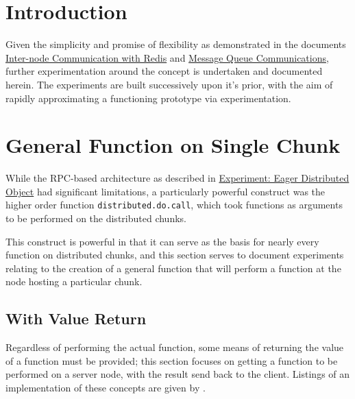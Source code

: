 \hypertarget{introduction}{%
\section{Introduction}\label{introduction}}

Given the simplicity and promise of flexibility as demonstrated in the
documents \href{inter-node-comm-w-redis.html}{Inter-node Communication
with Redis} and \href{message-queues-comms.html}{Message Queue
Communications}, further experimentation around the concept is
undertaken and documented herein. The experiments are built successively
upon it's prior, with the aim of rapidly approximating a functioning
prototype via experimentation.

\hypertarget{general-function-on-single-chunk}{%
\section{General Function on Single
Chunk}\label{general-function-on-single-chunk}}

While the RPC-based architecture as described in
\href{experiment-eager-dist-obj-pre.html}{Experiment: Eager Distributed
Object} had significant limitations, a particularly powerful construct
was the higher order function \texttt{distributed.do.call}, which took
functions as arguments to be performed on the distributed chunks.

This construct is powerful in that it can serve as the basis for nearly
every function on distributed chunks, and this section serves to
document experiments relating to the creation of a general function that
will perform a function at the node hosting a particular chunk.

\hypertarget{sec:val-ret}{%
\subsection{With Value Return}\label{sec:val-ret}}

Regardless of performing the actual function, some means of returning
the value of a function must be provided; this section focuses on
getting a function to be performed on a server node, with the result
send back to the client. Listings of an implementation of these concepts
are given by \cite{lst:vr-client}\cite{lst:vr-server}.


